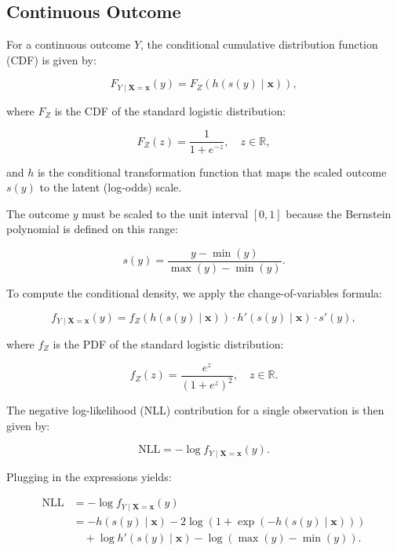 \subsection{Continuous Outcome}

For a continuous outcome $Y$, the conditional cumulative distribution function (CDF) is given by:

\begin{equation}
F_{Y \mid \mathbf{X} = \mathbf{x}}(y) = F_Z(h(s(y) \mid \mathbf{x})),
\end{equation}

where $F_Z$ is the CDF of the standard logistic distribution:

\begin{equation}
F_Z(z) = \frac{1}{1 + e^{-z}}, \quad z \in \mathbb{R},
\end{equation}

and $h$ is the conditional transformation function that maps the scaled outcome $s(y)$ to the latent (log-odds) scale.

The outcome $y$ must be scaled to the unit interval $[0, 1]$ because the Bernstein polynomial is defined on this range:

\begin{equation}
s(y) = \frac{y - \min(y)}{\max(y) - \min(y)}.
\end{equation}

To compute the conditional density, we apply the change-of-variables formula:

\begin{equation}
f_{Y \mid \mathbf{X} = \mathbf{x}}(y) = f_Z(h(s(y) \mid \mathbf{x})) \cdot h'(s(y) \mid \mathbf{x}) \cdot s'(y),
\end{equation}

where $f_Z$ is the PDF of the standard logistic distribution:

\begin{equation}
f_Z(z) = \frac{e^z}{(1 + e^z)^2}, \quad z \in \mathbb{R}.
\end{equation}

The negative log-likelihood (NLL) contribution for a single observation is then given by:

\begin{equation}
\text{NLL} = - \log f_{Y \mid \mathbf{X} = \mathbf{x}}(y).
\end{equation}

Plugging in the expressions yields:

\begin{align}
\text{NLL} &= - \log f_{Y \mid \mathbf{X} = \mathbf{x}}(y) \nonumber \\
&= -h(s(y) \mid \mathbf{x}) - 2 \log(1 + \exp(-h(s(y) \mid \mathbf{x}))) \nonumber \\
&\quad + \log h'(s(y) \mid \mathbf{x}) - \log(\max(y) - \min(y)).
\end{align}


